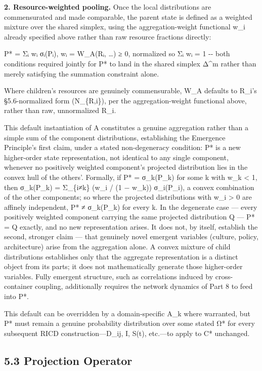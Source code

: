\documentclass[
]{article}
\begin{document}
\textbf{2. Resource-weighted pooling.} Once the local distributions are
commensurated and made comparable, the parent state is defined as a
weighted mixture over the shared simplex, using the aggregation-weight
functional w\_i already specified above rather than raw resource
fractions directly:

P* = Σᵢ wᵢ σᵢ(Pᵢ), wᵢ = W\_A(Rᵢ, \ldots) ≥ 0, normalized so Σᵢ wᵢ = 1
-\/- both conditions required jointly for P* to land in the shared
simplex Δ\^{}m rather than merely satisfying the summation constraint
alone.

Where children's resources are genuinely commensurable, W\_A defaults to
R\_i's §5.6-normalized form (N\_\{R,i\}), per the aggregation-weight
functional above, rather than raw, unnormalized R\_i.

This default instantiation of A constitutes a genuine aggregation rather
than a simple sum of the component distributions, establishing the
Emergence Principle's first claim, under a stated non-degeneracy
condition: P* is a new higher-order state representation, not identical
to any single component, whenever no positively weighted component's
projected distribution lies in the convex hull of the others'. Formally,
if P* = σ\_k(P\_k) for some k with w\_k \textless{} 1, then σ\_k(P\_k) =
Σ\_\{i≠k\} (w\_i / (1 − w\_k)) σ\_i(P\_i), a convex combination of the
other components; so where the projected distributions with w\_i
\textgreater{} 0 are affinely independent, P* ≠ σ\_k(P\_k) for every k.
In the degenerate case --- every positively weighted component carrying
the same projected distribution Q --- P* = Q exactly, and no new
representation arises. It does not, by
itself, establish the second, stronger claim --- that genuinely novel
emergent variables (culture, policy, architecture) arise from the
aggregation alone. A convex mixture of child distributions establishes
only that the aggregate representation is a distinct object from its
parts; it does not mathematically generate those higher-order variables.
Fully emergent structure, such as correlations induced by
cross-container coupling, additionally requires the network dynamics of
Part 8 to feed into P*.

This default can be overridden by a domain-specific A\_k where
warranted, but P* must remain a genuine probability distribution over
some stated Ω* for every subsequent RICD construction---D\_ij, I, S(t),
etc.---to apply to C* unchanged.

\hypertarget{projection-operator}{%
\subsection{5.3 Projection Operator}\label{projection-operator}}
\end{document}
